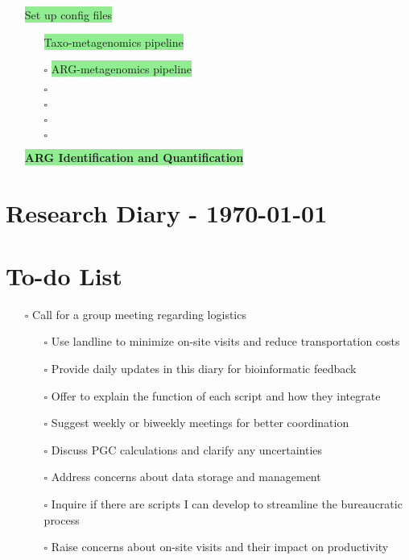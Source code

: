 \documentclass[11pt]{article}
\newcommand{\done}{\checkmark}  %
\newcommand{\pending}{$\square$}  %
\newcommand{\highlightessential}[1]{\colorbox{lightgreen}{#1}}  %
\begin{document}
\begin{itemize}
	\item [\done] \highlightessential{Set up config files}
	\begin {itemize}
		\item [\done] \highlightessential{Taxo-metagenomics pipeline}
		\item [\pending] \highlightessential{ARG-metagenomics pipeline}
		\item [\pending] 
		\item [\pending] 
		\item [\pending]
		\item [\pending]

	\end{itemize}
\par\noindent\highlightessential{\textbf{\large ARG Identification and Quantification}}	
\end{itemize}


\onecolumn
\newpage
\setcounter{section}{0}  %
	
	\section*{Research Diary - \today}
	
	\section{To-do List}
	\begin{itemize}
		\item [\pending] Call for a group meeting regarding logistics
		\begin{itemize}
			\item [\pending] Use landline to minimize on-site visits and reduce transportation costs
			\item [\pending] Provide daily updates in this diary for bioinformatic feedback
			\item [\pending] Offer to explain the function of each script and how they integrate
			\item [\pending] Suggest weekly or biweekly meetings for better coordination
			\item [\pending] Discuss PGC calculations and clarify any uncertainties
			\item [\pending] Address concerns about data storage and management
			\item [\pending] Inquire if there are scripts I can develop to streamline the bureaucratic process
			\item [\pending] Raise concerns about on-site visits and their impact on productivity
		\end{itemize}
	\end{itemize}
	
\end{document}
